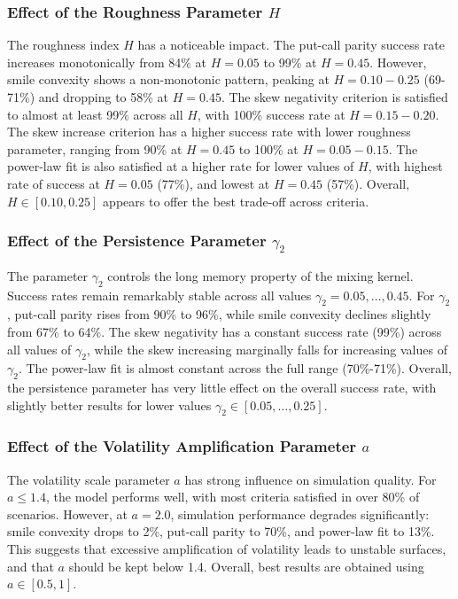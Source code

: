 \subsubsection*{Effect of the Roughness Parameter \texorpdfstring{$H$}{H}}
The roughness index $H$ has a noticeable impact. The put-call parity success rate increases monotonically from 84\% at $H = 0.05$ to 99\% at $H = 0.45$. However, smile convexity shows a non-monotonic pattern, peaking at $H = 0.10-0.25$ (69-71\%) and dropping to 58\% at $H = 0.45$. The skew negativity criterion is satisfied to almost at least 99\% across all $H$, with 100\% success rate at $H = 0.15-0.20$. The skew increase criterion has a higher success rate with lower roughness parameter, ranging from 90\% at $H = 0.45$ to 100\% at $H = 0.05-0.15$. The power-law fit is also satisfied at a higher rate for lower values of $H$, with highest rate of success at $H = 0.05$ (77\%), and lowest at $H = 0.45$ (57\%). Overall, $H \in [0.10, 0.25]$ appears to offer the best trade-off across criteria.

\subsubsection*{Effect of the Persistence Parameter \texorpdfstring{$\gamma_2$}{gamma2}}
The parameter $\gamma_2$ controls the long memory property of the mixing kernel. Success rates remain remarkably stable across all values $\gamma_2 = 0.05,\ldots,0.45$. For $\gamma_2$, put-call parity rises from 90\% to 96\%, while smile convexity declines slightly from 67\% to 64\%. The skew negativity has a constant success rate (99\%) across all values of $\gamma_2$, while the skew increasing marginally falls for increasing values of $\gamma_2$. The power-law fit is almost constant across the full range (70\%-71\%). Overall, the persistence parameter has very little effect on the overall success rate, with slightly better results for lower values $\gamma_2 \in [0.05, \ldots, 0.25]$.

\subsubsection*{Effect of the Volatility Amplification Parameter \texorpdfstring{$a$}{a}}
The volatility scale parameter $a$ has strong influence on simulation quality. For $a \leq 1.4$, the model performs well, with most criteria satisfied in over 80\% of scenarios. However, at $a = 2.0$, simulation performance degrades significantly: smile convexity drops to 2\%, put-call parity to 70\%, and power-law fit to 13\%. This suggests that excessive amplification of volatility leads to unstable surfaces, and that $a$ should be kept below 1.4. Overall, best results are obtained using $a \in [0.5, 1]$.

